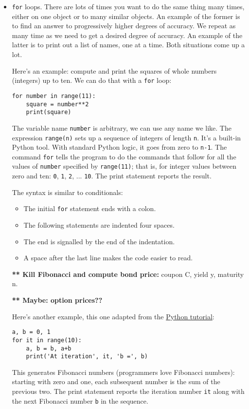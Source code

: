 \documentclass[11pt]{article}
\begin{document}
\begin{itemize}
\begin{comment}
if name1 < name2:
    print(name1)
else:
    print(name2)
\end{comment}


\item {\tt for} loops.
There are lots of times you want to do the same thing many times,
either on one object or to many similar objects.
An example of the former is to find an answer to progressively higher degrees of accuracy.
We repeat as many time as we need to get a desired degree of accuracy.
An example of the latter is to print out a list of names, one at a time.
Both situations come up a lot.

Here's an example:
compute and print the squares of whole numbers (integers) up to ten.
We can do that with a {\tt for} loop:
%
\begin{verbatim}
for number in range(11):
    square = number**2
    print(square)
\end{verbatim}
The variable name {\tt number} is arbitrary, we can use any name we like.
The expression {\tt range(n)} sets up a sequence of integers of length {\tt n}.
It's a built-in Python tool.
With standard Python logic, it goes from zero to {\tt n-1}.
The command {\tt for} tells the program to do the commands that follow
for all the values of {\tt number}
specified by {\tt range(11)};
that is, for integer values between zero and ten:
{\tt 0}, {\tt 1}, {\tt 2}, ... {\tt 10}.
The print statement reports the result.

The syntax is similar to conditionals:
\begin{itemize}
\item The initial {\tt for} statement ends with a colon.
\item The following statements are indented four spaces.
\item The end is signalled by the end of the indentation.
\item A space after the last line makes the code easier to read.
\end{itemize}


{\bf *** Kill Fibonacci and compute bond price:}
coupon C, yield y, maturity n.

{\bf *** Maybe:  option prices??}

Here's another example, this one adapted from the
\href{https://docs.python.org/3/tutorial/introduction.html#first-steps-towards-programming}{Python tutorial}:
%
\begin{verbatim}
a, b = 0, 1
for it in range(10):
    a, b = b, a+b
    print('At iteration', it, 'b =', b)
\end{verbatim}
This generates Fibonacci numbers
(programmers love Fibonacci numbers):
starting with zero and one, each subsequent number is the sum of the previous two.
The print statement reports the iteration number {\tt it} along with the next Fibonacci number {\tt b}
in the sequence.


\end{itemize}
\end{document}
